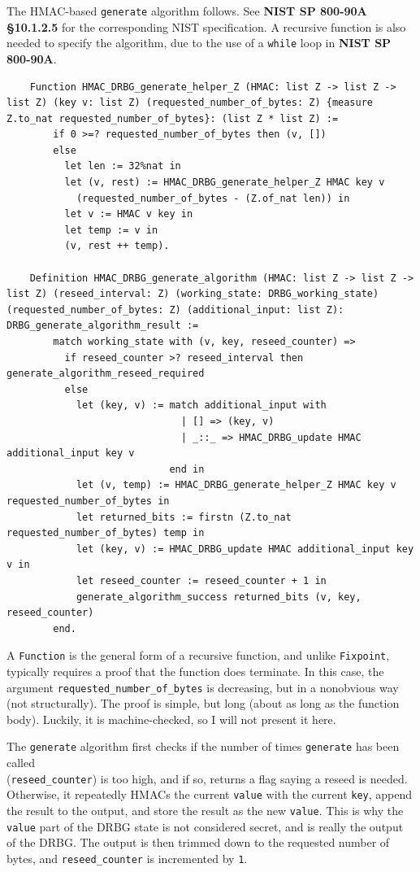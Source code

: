\documentclass[pageno]{jpaper}
\newcommand{\stdtitle}[1]{\textbf{#1}}
\begin{document}
The HMAC-based \lstinline{generate} algorithm follows. See \stdtitle{NIST SP 800-90A \S 10.1.2.5} for the corresponding NIST specification. A recursive function is also needed to specify the algorithm, due to the use of a \lstinline{while} loop in \stdtitle{NIST SP 800-90A}.


\begin{lstlisting}
    Function HMAC_DRBG_generate_helper_Z (HMAC: list Z -> list Z -> list Z) (key v: list Z) (requested_number_of_bytes: Z) {measure Z.to_nat requested_number_of_bytes}: (list Z * list Z) :=
        if 0 >=? requested_number_of_bytes then (v, [])
        else
          let len := 32%nat in
          let (v, rest) := HMAC_DRBG_generate_helper_Z HMAC key v
            (requested_number_of_bytes - (Z.of_nat len)) in
          let v := HMAC v key in
          let temp := v in
          (v, rest ++ temp).

    Definition HMAC_DRBG_generate_algorithm (HMAC: list Z -> list Z -> list Z) (reseed_interval: Z) (working_state: DRBG_working_state) (requested_number_of_bytes: Z) (additional_input: list Z): DRBG_generate_algorithm_result :=
        match working_state with (v, key, reseed_counter) =>
          if reseed_counter >? reseed_interval then generate_algorithm_reseed_required
          else
            let (key, v) := match additional_input with
                              | [] => (key, v)
                              | _::_ => HMAC_DRBG_update HMAC additional_input key v
                            end in
            let (v, temp) := HMAC_DRBG_generate_helper_Z HMAC key v requested_number_of_bytes in
            let returned_bits := firstn (Z.to_nat requested_number_of_bytes) temp in
            let (key, v) := HMAC_DRBG_update HMAC additional_input key v in
            let reseed_counter := reseed_counter + 1 in
            generate_algorithm_success returned_bits (v, key, reseed_counter)
        end.
\end{lstlisting}

A \lstinline{Function} is the general form of a recursive function, and unlike \lstinline{Fixpoint}, typically requires a proof that the function does terminate. In this case, the argument \lstinline{requested_number_of_bytes} is decreasing, but in a nonobvious way (not structurally). The proof is simple, but long (about as long as the function body). Luckily, it is machine-checked, so I will not present it here.

The \lstinline{generate} algorithm first checks if the number of times \lstinline{generate} has been called\\ (\lstinline{reseed_counter}) is too high, and if so, returns a flag saying a reseed is needed. Otherwise, it repeatedly HMACs the current \lstinline{value} with the current \lstinline{key}, append the result to the output, and store the result as the new \lstinline{value}. This is why the \lstinline{value} part of the DRBG state is not considered secret, and is really the output of the DRBG. The output is then trimmed down to the requested number of bytes, and \lstinline{reseed_counter} is incremented by \lstinline{1}.
\end{document}
